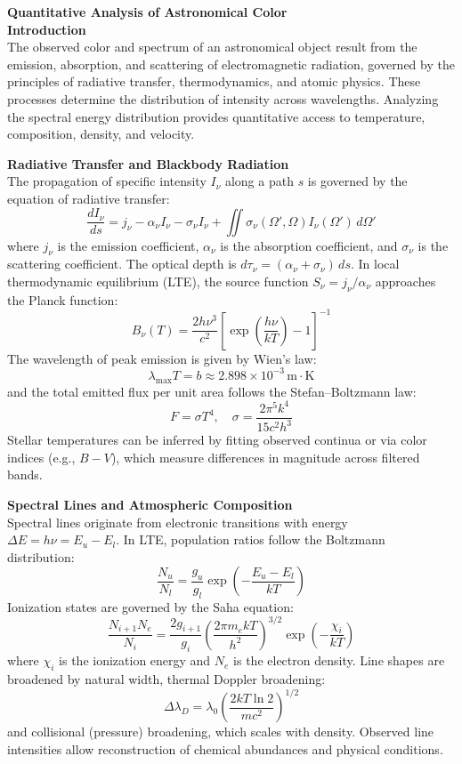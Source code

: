 \begin{technical}
{\Large\textbf{Quantitative Analysis of Astronomical Color}}\\[0.7em]

\noindent\textbf{Introduction}\\[0.5em]
The observed color and spectrum of an astronomical object result from the emission, absorption, and scattering of electromagnetic radiation, governed by the principles of radiative transfer, thermodynamics, and atomic physics. These processes determine the distribution of intensity across wavelengths. Analyzing the spectral energy distribution provides quantitative access to temperature, composition, density, and velocity.

\noindent\textbf{Radiative Transfer and Blackbody Radiation}\\[0.5em]
The propagation of specific intensity \( I_\nu \) along a path \( s \) is governed by the equation of radiative transfer:
\[
\frac{dI_\nu}{ds} = j_\nu - \alpha_\nu I_\nu - \sigma_\nu I_\nu + \iint \sigma_\nu(\Omega', \Omega) I_\nu(\Omega')\, d\Omega'
\]
where \( j_\nu \) is the emission coefficient, \( \alpha_\nu \) is the absorption coefficient, and \( \sigma_\nu \) is the scattering coefficient. The optical depth is \( d\tau_\nu = (\alpha_\nu + \sigma_\nu)\, ds \). In local thermodynamic equilibrium (LTE), the source function \( S_\nu = j_\nu/\alpha_\nu \) approaches the Planck function:
\[
B_\nu(T) = \frac{2h\nu^3}{c^2} \left[ \exp\left( \frac{h\nu}{kT} \right) - 1 \right]^{-1}
\]
The wavelength of peak emission is given by Wien's law:
\[
\lambda_{\text{max}} T = b \approx 2.898 \times 10^{-3} \, \text{m} \cdot \text{K}
\]
and the total emitted flux per unit area follows the Stefan--Boltzmann law:
\[
F = \sigma T^4, \quad \sigma = \frac{2\pi^5 k^4}{15c^2 h^3}
\]
Stellar temperatures can be inferred by fitting observed continua or via color indices (e.g., \( B-V \)), which measure differences in magnitude across filtered bands.

\noindent\textbf{Spectral Lines and Atmospheric Composition}\\[0.5em]
Spectral lines originate from electronic transitions with energy \( \Delta E = h\nu = E_u - E_l \). In LTE, population ratios follow the Boltzmann distribution:
\[
\frac{N_u}{N_l} = \frac{g_u}{g_l} \exp\left( -\frac{E_u - E_l}{kT} \right)
\]
Ionization states are governed by the Saha equation:
\[
\frac{N_{i+1} N_e}{N_i} = \frac{2 g_{i+1}}{g_i} \left( \frac{2\pi m_e kT}{h^2} \right)^{3/2} \exp\left( -\frac{\chi_i}{kT} \right)
\]
where \( \chi_i \) is the ionization energy and \( N_e \) is the electron density. Line shapes are broadened by natural width, thermal Doppler broadening:
\[
\Delta \lambda_D = \lambda_0 \left( \frac{2kT \ln 2}{mc^2} \right)^{1/2}
\]
and collisional (pressure) broadening, which scales with density. Observed line intensities allow reconstruction of chemical abundances and physical conditions.


\end{technical}
